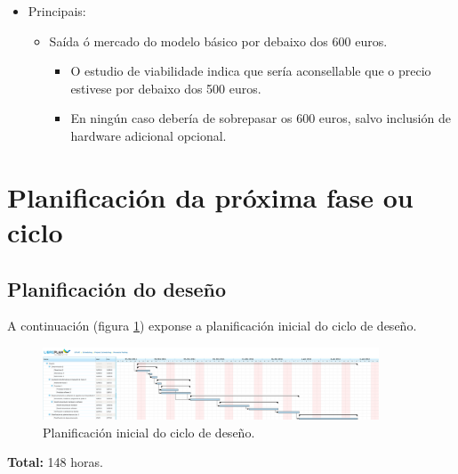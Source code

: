 \begin{itemize}
\begin{itemize}
          \item Principais:
                \begin{itemize}
                 \item Saída ó mercado do modelo básico por debaixo dos 600
                       euros.
                       \begin{itemize}
                        \item O estudio de viabilidade indica que sería
                              aconsellable que o precio estivese por debaixo
                              dos 500 euros.
                        \item En ningún caso debería de sobrepasar os 600
                              euros, salvo inclusión de hardware adicional
                              opcional.
                       \end{itemize}
                \end{itemize}
         \end{itemize}
  \end{itemize}

\section{Planificación da próxima fase ou ciclo}

 \subsection{Planificación do deseño}

 A continuación (figura \ref{figura:PlanificacionInicialDeseno}) exponse a
 planificación inicial do ciclo de deseño. \\

 \begin{figure}[htbp]
  \centering
  \includegraphics[width=10cm]{./imagenes/deseno.png}
  \caption{Planificación inicial do ciclo de deseño.}
  \label{figura:PlanificacionInicialDeseno}
 \end{figure}

 \textbf{Total:} 148 horas.